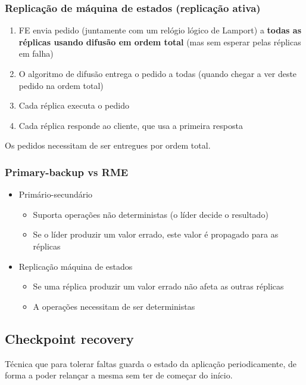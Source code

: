 \documentclass[12pt]{article}
\begin{document}
\subsubsection{Replicação de máquina de estados (replicação ativa)}

\begin{enumerate}
    \item FE envia pedido (juntamente com um relógio lógico de Lamport) a \textbf{todas as réplicas usando difusão em ordem total} (mas sem esperar pelas réplicas em falha)
    \item O algoritmo de difusão entrega o pedido a todas (quando chegar a ver deste pedido na ordem total)
    \item Cada réplica executa o pedido
    \item Cada réplica responde ao cliente, que usa a primeira resposta
\end{enumerate}

Os pedidos necessitam de ser entregues por ordem total.

\subsubsection{Primary-backup vs RME}

\begin{itemize}
    \item Primário-secundário
    \begin{itemize}
        \item Suporta operações não deterministas (o líder decide o resultado)
        \item Se o líder produzir um valor errado, este valor é propagado para as réplicas
    \end{itemize}
    \item Replicação máquina de estados
    \begin{itemize}
        \item Se uma réplica produzir um valor errado não afeta as outras réplicas
        \item A operações necessitam de ser deterministas
    \end{itemize}
\end{itemize}

\subsection{Checkpoint recovery}

Técnica que para tolerar faltas guarda o estado da aplicação periodicamente, de forma a poder relançar a mesma sem ter de começar do início.
\end{document}
